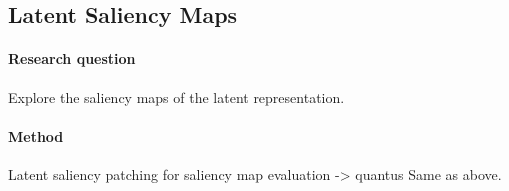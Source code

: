 \subsection{Latent Saliency Maps}
\paragraph{Research question}
Explore the saliency maps of the latent representation.
\paragraph{Method}
Latent saliency patching for saliency map evaluation -> quantus
Same as above.
